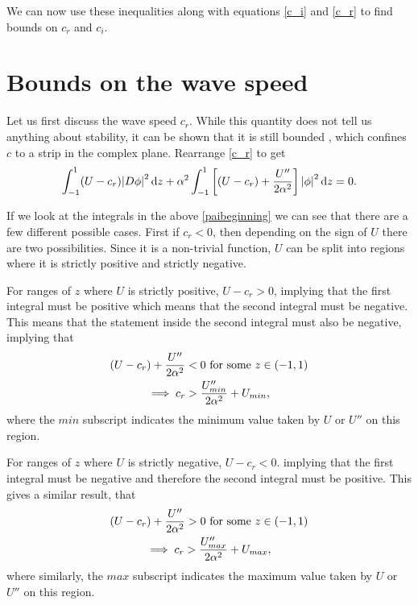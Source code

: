We can now use these inequalities along with equations \eqref{c_i} and \eqref{c_r} to find bounds on $ c_r$ and $ c_i$.

\section{Bounds on the wave speed}
Let us first discuss the wave speed $ c_r $. While this quantity does not tell us anything about stability, it can be shown that it is still bounded \citep{synge1938hydrodynamical, pai1954generalization, joseph1968eigenvalue, joseph1969eigenvalue}, which confines $ c $ to a strip in the complex plane.%
Rearrange \eqref{c_r} to get
\begin{equation}
    \int^{1}_{-1} (U - c_r) \abs{D \phi}^2 \dd{z} + \alpha^2 \int^{1}_{-1} \left[(U - c_r) + \frac{U''}{2 \alpha^2}\right]\abs{\phi}^2 \dd{z} = 0.
    \label{paibeginning}
\end{equation}

If we look at the integrals in the above \eqref{paibeginning} we can see that there are a few different possible cases. First if $ c_r < 0$, then depending on the sign of $ U $ there are two possibilities. Since it is a non-trivial function, $ U $ can be split into regions where it is strictly positive and strictly negative. 

For ranges of $ z $ where $ U $ is strictly positive, $ U - c_r > 0 $, implying that the first integral must be positive which means that the second integral must be negative. This means that the statement inside the second integral must also be negative, implying that
\begin{gather}
    (U - c_r) + \frac{U''}{2 \alpha^2} < 0 \text{ for some } z \in (-1, 1) \nonumber\\
    \implies c_r > \frac{U''_{min}}{2 \alpha^2} + U_{min}, 
    \label{inequality}
\end{gather}
where the $min$ subscript indicates the minimum value taken by $U$ or $U''$ on this region.

For ranges of $z $ where $ U $ is strictly negative, $ U - c_r < 0 $. implying that the first integral must be negative and therefore the second integral must be positive. This gives a similar result, that 
\begin{gather}
    (U - c_r) + \frac{U''}{2 \alpha^2} > 0 \text{ for some } z \in (-1, 1) \nonumber\\
    \implies c_r > \frac{U''_{max}}{2 \alpha^2} + U_{max},
\end{gather}
where similarly, the $max$ subscript indicates the maximum value taken by $U$ or $U''$ on this region.

